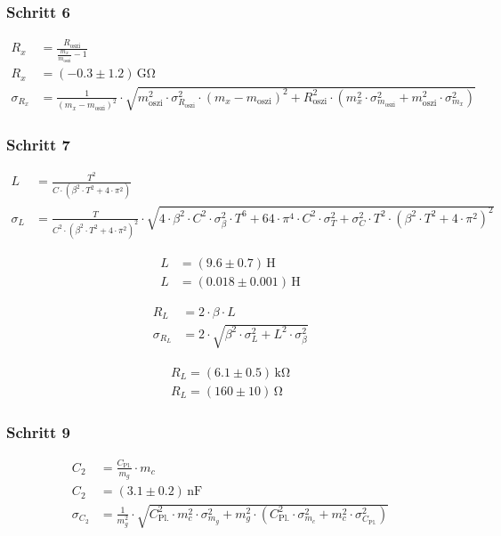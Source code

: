 \documentclass[12pt,a4paper,titlepage,headinclude,bibtotoc]{scrartcl}
\begin{document}
\subsubsection{Schritt 6}
\begin{align*}
	R_x&=\frac{R_\text{oszi}}{\frac{m_x}{m_\text{oszi}} - 1}\\
	R_x&=\left(-0.3 \pm 1.2\right) \, \si{\giga\ohm}\\
	\sigma_{R_x}&=\frac{1}{\left(m_x - m_\text{oszi}\right)^{2}} \cdot \sqrt{m_\text{oszi}^{2} \cdot \sigma_{R_\text{oszi}}^{2} \cdot \left(m_x - m_\text{oszi}\right)^{2} + R_\text{oszi}^{2} \cdot \left(m_x^{2} \cdot \sigma_{m_\text{oszi}}^{2} + m_\text{oszi}^{2} \cdot \sigma_{m_x}^{2}\right)}
\end{align*}

\subsubsection{Schritt 7}
\begin{align*}
L&=\frac{T^{2}}{C \cdot \left(\beta^{2} \cdot T^{2} + 4 \cdot \pi^{2}\right)}\\
\sigma_{L}&=\frac{T}{C^{2} \cdot \left(\beta^{2} \cdot T^{2} + 4 \cdot \pi^{2}\right)^{2}} \cdot \sqrt{4 \cdot \beta^{2} \cdot C^{2} \cdot \sigma_{\beta}^{2} \cdot T^{6} + 64 \cdot \pi^{4} \cdot C^{2} \cdot \sigma_{T}^{2} + \sigma_{C}^{2} \cdot T^{2} \cdot \left(\beta^{2} \cdot T^{2} + 4 \cdot \pi^{2}\right)^{2}}
\end{align*}
	
\begin{align*}
	L&=(9.6 \pm 0.7)\, \si{\henry}\\
	L&=(0.018 \pm 0.001)\, \si{\henry}
\end{align*}

\begin{align*}
R_L&=2 \cdot \beta \cdot L\\
\sigma_{R_L}&=2 \cdot \sqrt{\beta^{2} \cdot \sigma_{L}^{2} + L^{2} \cdot \sigma_{\beta}^{2}}
\end{align*}

\begin{align*}
	R_L=\left(6.1 \pm 0.5\right)\, \si{\kilo\ohm}\\
	R_L=\left(160 \pm 10\right)\, \si{\ohm}
\end{align*}

\subsubsection{Schritt 9}
\begin{align*}
C_2&=\frac{C_\text{Pl.}}{m_g} \cdot m_c\\
C_2&=\left(3.1 \pm 0.2\right) \, \si{\nano\farad}\\
\sigma_{C_2}&=\frac{1}{m_g^{2}} \cdot \sqrt{C_\text{Pl.}^{2} \cdot m_c^{2} \cdot \sigma_{m_g}^{2} + m_g^{2} \cdot \left(C_\text{Pl.}^{2} \cdot \sigma_{m_c}^{2} + m_c^{2} \cdot \sigma_{C_\text{Pl.}}^{2}\right)}
\end{align*}
\end{document}
